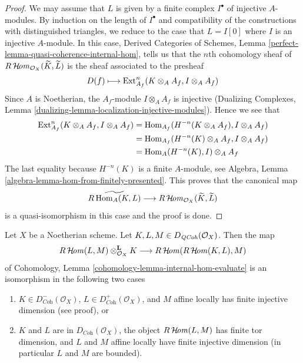 \begin{proof}
We may assume that $L$ is given by a finite complex $I^\bullet$
of injective $A$-modules. By induction on the length of $I^\bullet$
and compatibility of the constructions with distinguished triangles,
we reduce to the case that $L = I[0]$ where $I$ is an injective $A$-module.
In this case, Derived Categories of Schemes, Lemma
\ref{perfect-lemma-quasi-coherence-internal-hom}, tells us that
the $n$th cohomology sheaf of
$R\mathop{\mathcal{H}\!\mathit{om}}\nolimits_{\mathcal{O}_X}(\widetilde{K}, \widetilde{L})$
is the sheaf associated to the presheaf
$$
D(f) \longmapsto \mathop{\mathrm{Ext}}\nolimits^n_{A_f}(K \otimes_A A_f, I \otimes_A A_f)
$$
Since $A$ is Noetherian, the $A_f$-module $I \otimes_A A_f$ is injective
(Dualizing Complexes, Lemma
\ref{dualizing-lemma-localization-injective-modules}). Hence we see that
\begin{align*}
\mathop{\mathrm{Ext}}\nolimits^n_{A_f}(K \otimes_A A_f, I \otimes_A A_f)
& =
\mathop{\mathrm{Hom}}\nolimits_{A_f}(H^{-n}(K \otimes_A A_f), I \otimes_A A_f) \\
& =
\mathop{\mathrm{Hom}}\nolimits_{A_f}(H^{-n}(K) \otimes_A A_f, I \otimes_A A_f) \\
& =
\mathop{\mathrm{Hom}}\nolimits_A(H^{-n}(K), I) \otimes_A A_f
\end{align*}
The last equality because $H^{-n}(K)$ is a finite $A$-module, see
Algebra, Lemma \ref{algebra-lemma-hom-from-finitely-presented}.
This proves that the canonical map
$$
\widetilde{R\mathop{\mathrm{Hom}}\nolimits_A(K, L)}
\longrightarrow
R\mathop{\mathcal{H}\!\mathit{om}}\nolimits_{\mathcal{O}_X}(\widetilde{K}, \widetilde{L})
$$
is a quasi-isomorphism in this case and the proof is done.
\end{proof}

\begin{lemma}
\label{lemma-internal-hom-evaluate-isom}
Let $X$ be a Noetherian scheme. Let $K, L, M \in D_{\mathit{QCoh}}(\mathcal{O}_X)$. 
Then the map
$$
R\mathop{\mathcal{H}\!\mathit{om}}\nolimits(L, M) \otimes_{\mathcal{O}_X}^\mathbf{L} K
\longrightarrow
R\mathop{\mathcal{H}\!\mathit{om}}\nolimits(R\mathop{\mathcal{H}\!\mathit{om}}\nolimits(K, L), M)
$$
of Cohomology, Lemma \ref{cohomology-lemma-internal-hom-evaluate}
is an isomorphism in the following two cases
\begin{enumerate}
\item $K \in D^-_{\textit{Coh}}(\mathcal{O}_X)$,
$L \in D^+_{\textit{Coh}}(\mathcal{O}_X)$, and $M$ affine locally has
finite injective dimension (see proof), or
\item $K$ and $L$ are in $D_{\textit{Coh}}(\mathcal{O}_X)$,
the object $R\mathop{\mathcal{H}\!\mathit{om}}\nolimits(L, M)$ has finite tor dimension, and
$L$ and $M$ affine locally have finite injective dimension
(in particular $L$ and $M$ are bounded).
\end{enumerate}
\end{lemma}

